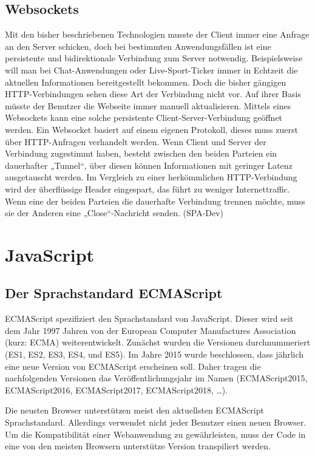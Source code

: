 \subsection{Websockets}

Mit den bisher beschriebenen Technologien musste der Client immer eine Anfrage an den Server schicken, doch bei bestimmten Anwendungsfällen ist eine persistente und bidirektionale Verbindung zum Server notwendig. Beispielsweise will man bei Chat-Anwendungen oder Live-Sport-Ticker immer in Echtzeit die aktuellen Informationen bereitgestellt bekommen. Doch die bisher gängigen HTTP-Verbindungen sehen diese Art der Verbindung nicht vor. Auf ihrer Basis müsste der Benutzer die Webseite immer manuell aktualisieren. Mittels eines Websockets kann eine solche persistente Client-Server-Verbindung geöffnet werden. Ein Websocket basiert auf einem eigenen Protokoll, dieses muss zuerst über HTTP-Anfragen verhandelt werden. Wenn Client und Server der Verbindung zugestimmt haben, besteht zwischen den beiden Parteien ein dauerhafter „Tunnel“, über diesen können Informationen mit geringer Latenz ausgetauscht werden. Im Vergleich zu einer herkömmlichen HTTP-Verbindung wird der überflüssige Header eingespart, das führt zu weniger Internettraffic. Wenn eine der beiden Parteien die dauerhafte Verbindung trennen möchte, muss sie der Anderen eine „Close“-Nachricht senden.\autocites[vgl.][11\psqq]{Fink2014} (SPA-Dev)

\label{MVC}


\section{JavaScript}

\subsection{Der Sprachstandard ECMAScript}\label{sec:der-sprachstandard-ecmascript}
ECMAScript spezifiziert den Sprachstandard von JavaScript. Dieser wird seit dem Jahr 1997 Jahren von der European Computer Manufactures Association (kurz: ECMA) weiterentwickelt. Zunächst wurden die Versionen durchnummeriert (ES1, ES2, ES3, ES4, und ES5). Im Jahre 2015 wurde beschlossen, dass jährlich eine neue Version von ECMAScript erscheinen soll. Daher tragen die nachfolgenden Versionen das Veröffentlichungsjahr im Namen (ECMAScript2015, ECMAScript2016, ECMAScript2017, ECMAScript2018, …). 

Die neusten Browser unterstützen meist den aktuellsten ECMAScript Sprachstandard. Allerdings verwendet nicht jeder Benutzer einen neuen Browser. Um die Kompatibilität einer Webanwendung zu gewährleisten, muss der Code in eine von den meisten Browsern unterstütze Version transpiliert werden.\autocites[vgl.][27\psqq]{Woiwode.2018}[vgl.][]{Terlson.2018}[vgl.][13\psqq]{Steyer.2017}

